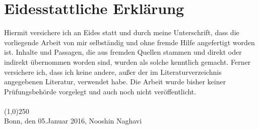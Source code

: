 \documentclass[12pt,twoside]{report}
\begin{document}
	
	
	
	
	
	\chapter*{Eidesstattliche Erklärung}
		Hiermit versichere ich an Eides statt und durch meine Unterschrift, dass die vorliegende Arbeit von mir selbständig und ohne fremde Hilfe angefertigt worden ist. Inhalte und Passagen, die aus fremden Quellen stammen und direkt oder indirekt übernommen worden sind, wurden als solche kenntlich gemacht. Ferner versichere ich, dass ich keine andere, außer der im Literaturverzeichnis angegebenen Literatur, verwendet habe. Die Arbeit wurde bisher keiner Prüfungsbehörde vorgelegt und auch noch nicht veröffentlicht.\\
		\\
		
		
		\line(1,0){250}\\
		Bonn, den 05.Januar 2016, Nooshin Naghavi 
\end{document}

